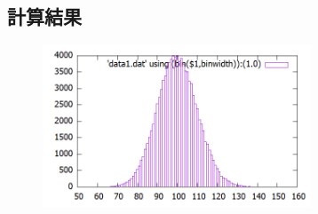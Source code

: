 \documentclass[ %
  platex,%
  papersize,%
  twocolumn,
  landscape
]{jsarticle}
\begin{document}
\subsection{計算結果}
\begin{figure}[H]
\begin{center}
\includegraphics[width=8cm]{../cpp/out/dice_game/data1.png}
\end{center}
\caption{}
\end{figure}
\end{document}
